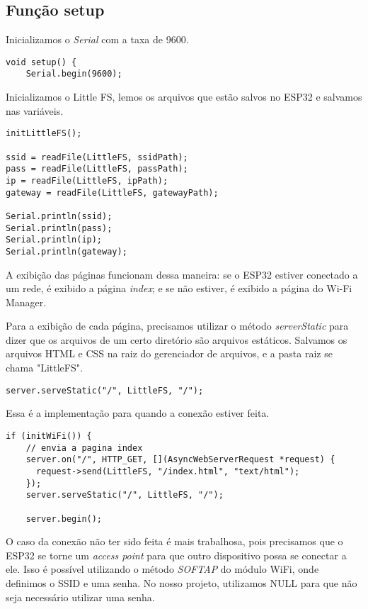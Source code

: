 \subsection{Função setup}

Inicializamos o \textit{Serial} com a taxa de 9600.

\begin{lstlisting}
void setup() {
    Serial.begin(9600);
\end{lstlisting}

Inicializamos o Little FS, lemos os arquivos que estão salvos no ESP32 e salvamos nas variáveis.

\begin{lstlisting}
initLittleFS();

ssid = readFile(LittleFS, ssidPath);
pass = readFile(LittleFS, passPath);
ip = readFile(LittleFS, ipPath);
gateway = readFile(LittleFS, gatewayPath);

Serial.println(ssid);
Serial.println(pass);
Serial.println(ip);
Serial.println(gateway);
\end{lstlisting}

A exibição das páginas funcionam dessa maneira: se o ESP32 estiver conectado a um rede, é exibido a página \textit{index}; e se não estiver, é exibido a página do Wi-Fi Manager.

Para a exibição de cada página, precisamos utilizar o método \textit{serverStatic} para dizer que os arquivos de um certo diretório são arquivos estáticos. Salvamos os arquivos HTML e CSS na raiz do gerenciador de arquivos, e a pasta raiz se chama "LittleFS".

\begin{lstlisting}
server.serveStatic("/", LittleFS, "/");
\end{lstlisting}

Essa é a implementação para quando a conexão estiver feita.

\begin{lstlisting}
if (initWiFi()) {
    // envia a pagina index
    server.on("/", HTTP_GET, [](AsyncWebServerRequest *request) {
      request->send(LittleFS, "/index.html", "text/html");
    });
    server.serveStatic("/", LittleFS, "/");
    
    server.begin();
\end{lstlisting}

O caso da conexão não ter sido feita é mais trabalhosa, pois precisamos que o ESP32 se torne um \textit{access point} para que outro dispositivo possa se conectar a ele. Isso é possível utilizando o método \textit{SOFTAP} do módulo WiFi, onde definimos o SSID e uma senha. No nosso projeto, utilizamos NULL para que não seja necessário utilizar uma senha.

